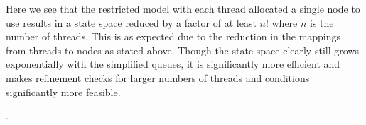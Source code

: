   Here we see that the restricted model with each thread allocated a single node to use results in a state space reduced by a factor of at least $n!$ where $n$ is the number of threads. This is as expected due to the reduction in the mappings from threads to nodes as stated above. Though the state space clearly still grows exponentially with the simplified queues, it is significantly more efficient and makes refinement checks for larger numbers of threads and conditions significantly more feasible.
  
  
  

  

  .





   


  